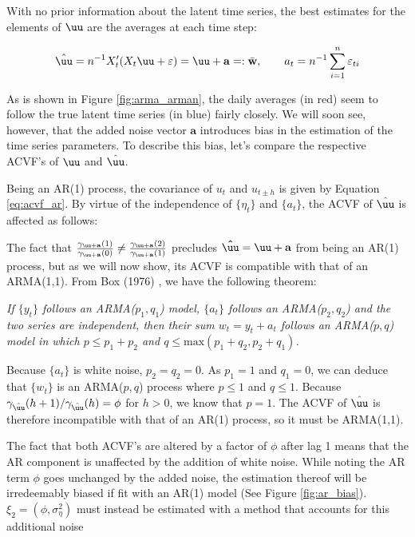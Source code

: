  With no prior information about the latent time series, the best estimates for the elements of $\uu$ are the averages at each time step:

$$ \hat{\uu} = n^{-1}X_t'(X_t\uu + \varepsilon) = \uu + \mathbf{a} =: \bar{\mathbf{w}}, \qquad a_t = n^{-1}\sum_{i=1}^{n}\varepsilon_{ti} $$

As is shown in Figure \ref{fig:arma_arman}, the daily averages (in red) seem to follow the true latent time series (in blue) fairly closely. We will soon see, however, that the added noise vector $\mathbf{a}$ introduces bias in the estimation of the time series parameters. To describe this bias, let's compare the respective ACVF's of $\uu$ and $\hat{\uu}$.



Being an AR(1) process, the covariance of $u_t$ and $u_{t\pm h}$ is given by Equation \ref{eq:acvf_ar}. By virtue of the independence of $\{\eta_t\}$ and $\{a_t\}$, the ACVF of $\hat{\uu}$ is affected as follows:





The fact that $\frac{\gamma_{\uu + \mathbf{a}}(1)}{\gamma_{\uu + \mathbf{a}}(0)} \neq \frac{\gamma_{\uu + \mathbf{a}}(2)}{\gamma_{\uu + \mathbf{a}}(1)}$ precludes $\mathbf{\hat{\uu}} = \uu + \mathbf{a}$ from being an AR(1) process, but as we will now show, its ACVF is compatible with that of an ARMA(1,1). From Box (1976) \citep{box1976time}, we have the following theorem:

\textit{If $\{y_t\}$ follows an ARMA($p_1,q_1$) model, $\{a_t\}$ follows an ARMA($p_2,q_2$) and the two series are independent, then their sum $w_t = y_t + a_t$ follows an ARMA($p,q$) model in which $p \leq p_1 + p_2$ and $q \leq \text{max}(p_1 + q_2,p_2 + q_1)$. }

Because $\{a_t\}$ is white noise, $p_2 = q_2 = 0$. As $p_1=1$ and $q_1=0$, we can deduce that $\{w_t\}$ is an ARMA($p,q$) process where $p\leq 1$ and $q \leq 1$. Because $\gamma_{\hat{\uu}}(h+1)/\gamma_{\hat{\uu}}(h) = \phi $ for $h > 0$, we know that $p = 1$. The ACVF of $\hat{\uu}$ is therefore incompatible with that of an AR(1) process, so it must be ARMA(1,1).


 The fact that both ACVF's are altered by a factor of $\phi$ after lag 1 means that the AR component is unaffected by the addition of white noise. While noting the AR term $\phi$ goes unchanged by the added noise, the estimation thereof will be irredeemably biased if fit with an AR(1) model (See Figure \ref{fig:ar_bias}). $\xi_2 = (\phi,\sigma_\eta^2)$ must instead be estimated with a method that accounts for this additional noise


